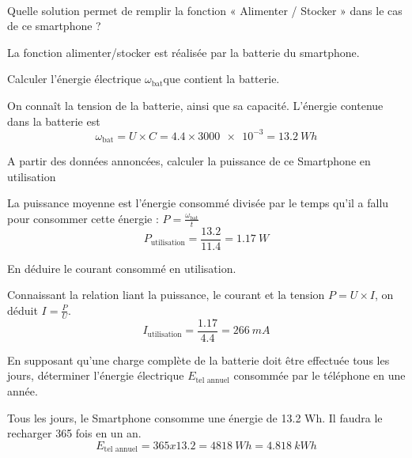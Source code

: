 \documentclass[10pt,fleqn]{article} %
\begin{document}
\begin{exercise}~

\begin{question}
  Quelle solution permet de remplir la fonction « Alimenter / Stocker » dans le cas de ce smartphone ?
\end{question} 
\begin{solution}
  La fonction alimenter/stocker est réalisée par la batterie du smartphone. 
\end{solution}

\begin{question}
  Calculer l’énergie électrique $\omega_\text{bat}$que contient la batterie.
\end{question}
\begin{solution}
  On connaît la tension de la batterie, ainsi que sa capacité. L'énergie 
  contenue dans la batterie est $$\omega_\text{bat} = U\times C = 4.4 \times \num{3000e-3}=\SI{13.2}{Wh} $$
\end{solution}

\begin{question}
  A partir des données annoncées, calculer la puissance de ce Smartphone en 
 utilisation
\end{question}
\begin{solution}
La puissance moyenne est l'énergie consommé divisée par le temps qu'il a fallu pour consommer cette énergie : $P = \frac{\omega_\text{bat}}{t}$ 
$$P_{\text{utilisation}} = \frac{13.2}{11.4} = \SI{1.17}{W}$$
\end{solution}

\begin{question}
  En déduire le courant consommé en utilisation.
\end{question}
\begin{solution}
  Connaissant la relation liant la puissance, le courant et la tension 
  $P=U\times I$, on déduit $I = \frac{P}{U}$.
  $$I_{\text{utilisation}} = \frac{1.17}{4.4} = \SI{266}{mA}$$
\end{solution}

\begin{question}
  En supposant qu’une charge complète de la batterie doit être effectuée tous les jours, déterminer l’énergie électrique $E_{\text{tel annuel}}$ consommée par le téléphone en une année.
\end{question}
\begin{solution}
  Tous les jours, le Smartphone consomme une énergie de 13.2 Wh.
Il faudra le recharger 365 fois en un an.
$$E_{\text{tel annuel}} = 365 x 13.2 = \SI{4 818}{Wh} = \SI{4.818}{kWh}$$
\end{solution}


\end{exercise}
\end{document}
